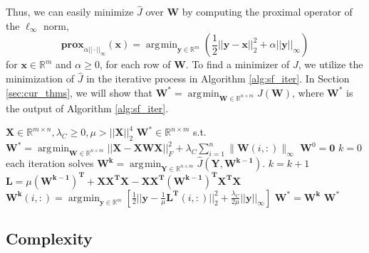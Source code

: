 \documentclass[12pt]{article}
\DeclareMathOperator*{\argmin}{\arg\!\min}
\begin{document}
Thus, we can easily minimize $\widehat{J}$ over $\mathbf{W}$ by computing the proximal operator of the $\ell_\infty$ norm, 
\begin{equation}
\label{eqn:cur_proxop}
\textbf{prox}_{\alpha ||\cdot||_\infty}(\mathbf{x}) = \argmin_{\mathbf{y} \in \mathbb{R}^m} \left(\frac{1}{2}||\mathbf{y-x}||_2^2 + \alpha ||\mathbf{y}||_\infty \right)
\end{equation}
for $\mathbf{x} \in \mathbb{R}^m$ and $\alpha \geq 0$, for each row of $\mathbf{W}$.  To find a minimizer of $J$, we utilize the minimization of $\widehat{J}$ in the iterative process in Algorithm \ref{alg:sf_iter}. In Section \ref{sec:cur_thms}, we will show that $\mathbf{W^*} = \argmin_{\mathbf{W} \in \mathbb{R}^{n \times m}} J(\mathbf{W})$, where $\mathbf{W^*}$ is the output of Algorithm \ref{alg:sf_iter}.

\begin{algorithm}
\caption{Convex Optimization Using the Surrogate Functional}
\begin{algorithmic}[1]
\Require $\mathbf{X} \in \mathbb{R}^{m \times n}, \lambda_C \geq 0, \mu > ||\mathbf{X} ||_2^4$ 
\Ensure $\mathbf{W^*} \in \mathbb{R}^{n \times m}$ s.t. $\mathbf{W^*} = \argmin_{\mathbf{W} \in \mathbb{R}^{n \times m}} ||\mathbf{X-XWX}||_F^2 + \lambda_C \sum_{i=1}^n  \|\mathbf{W}(i,:) \|_{\infty}$
\State $\mathbf{W}^0 = \mathbf{0}$
\State $k = 0$
\Repeat  \Comment each iteration solves $\mathbf{W^k} = \argmin_{\mathbf{Y} \in \mathbb{R}^{n \times m}} \widehat{J}(\mathbf{Y},\mathbf{W^{k-1}})$.
    \State $k = k+1$
    \State $\mathbf{L} =  \mu \mathbf{(W^{k-1})^T} + \mathbf{XX^TX} - \mathbf{XX^T (W^{k-1})^T X^TX}$
        \State $\mathbf{W^k}(i,:) = \argmin_{\mathbf{y} \in \mathbb{R}^{m}} \left[ \frac{1}{2}||\mathbf{y} - \frac{1}{\mu}\mathbf{L^T}(i,:)||^2_2 + \frac{\lambda_C}{2\mu} ||\mathbf{y}||_{\infty} \right]$
    \EndFor
{}
\State $\mathbf{W^*} = \mathbf{W^k}$  
\State \Return $\mathbf{W^*}$
\end{algorithmic}
\label{alg:sf_iter}
\end{algorithm}


\subsection{Complexity}
\end{document}
